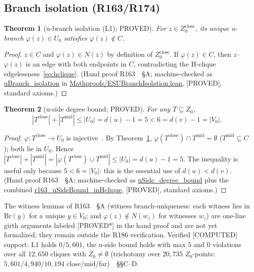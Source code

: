 \documentclass[11pt,a4paper]{article}
\newtheorem{theorem}{Theorem}
\theoremstyle{definition}
\begin{document}
\subsection{Branch isolation (R163/R174)}

\begin{theorem}[u-branch isolation (L1); PROVED]
  \label{thm:l1}
  For $z\in Z_0^{\mathrm{close}}$, its unique u-branch $\varphi(z)\in U_0$
  satisfies $\varphi(z)\notin C$.
\end{theorem}
\begin{proof}
$z\in C$ and $\varphi(z)\in N(z)$ by definition of
$Z_0^{\mathrm{close}}$. If $\varphi(z)\in C$, then $z$--$\varphi(z)$ is
an edge with both endpoints in $C$, contradicting the H-clique
edgelessness~\eqref{eq:hclique}. (Hand proof R163~\cite{R163}~\S A;
machine-checked as \url{uBranch_isolation} in
\url{Mathproofs/ESUBranchIsolation.lean}, [PROVED], standard axioms.)
\end{proof}

\begin{theorem}[u-side degree bound; PROVED]
  \label{thm:ubound}
  For any $T\subseteq Z_0$,
  \begin{equation}
    \label{eq:ubound}
    |T^{\mathrm{close}}|+|T^{\mathrm{mid}}|\le|U_0|=d(u)-1=5<6=d(v)-1=|V_0|.
  \end{equation}
\end{theorem}
\begin{proof}
$\varphi:T^{\mathrm{close}}\to U_0$ is injective~\cite{R145}. By
Theorem~\ref{thm:l1}, $\varphi(T^{\mathrm{close}})\cap T^{\mathrm{mid}}
=\emptyset$ ($T^{\mathrm{mid}}\subseteq C$); both lie in $U_0$. Hence
$|T^{\mathrm{close}}|+|T^{\mathrm{mid}}|
=|\varphi(T^{\mathrm{close}})\cup T^{\mathrm{mid}}|\le|U_0|
=d(u)-1=5$. The inequality is useful only because
$5<6=|V_0|$: this is the essential use of $d(u)<d(v)$. (Hand proof
R163~\cite{R163}~\S A; machine-checked as
\url{uSide_degree_bound} plus the combined
\url{r163_uSideBound_inHclique}, [PROVED], standard axioms.)
\end{proof}

The witness lemmas of R163~\cite{R163}~\S A (witness branch-uniqueness:
each witness lies in $\mathrm{Br}(y)$ for a unique $y\in V_0$; and
$\varphi(z)\notin N(w_z)$ for witnesses $w_z$) are one-line girth
arguments labeled [PROVED*] in the hand proof and are not yet
formalized; they remain outside the R186 verification. Verified
[COMPUTED] support: L1 holds $0/5{,}601$, the u-side bound holds with
max $5$ and $0$ violations over all $12{,}650$ cliques with
$Z_0\neq\emptyset$ (trichotomy over $20{,}735$ $Z_0$-points:
$5{,}601/4{,}940/10{,}194$ close/mid/far)~\cite{R163}~\S\S C--D.
\end{document}
